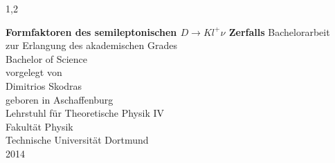\documentclass[11pt,a4paper,twoside]{report}
\begin{document}
\begin{spacing}{1,2}

%
%


\newcommand{\thetitle}{Formfaktoren des semileptonischen $D \rightarrow  K l^+ \nu$ Zerfalls}

\thispagestyle{empty}
\begin{center}

\Huge\textbf{\thetitle}
\vfill
\vfill
\Large
Bachelorarbeit \\ zur Erlangung des akademischen Grades \\ Bachelor of Science \\
\vspace{20pt}
\normalsize
vorgelegt von \\[5pt]
{\Large Dimitrios Skodras} \\[5pt]
geboren in Aschaffenburg \\
\vspace{20pt}
Lehrstuhl für Theoretische Physik IV \\ Fakultät Physik \\
Technische Universität Dortmund \\ 2014
\end{center}
\newpage


\end{spacing}
\end{document}
